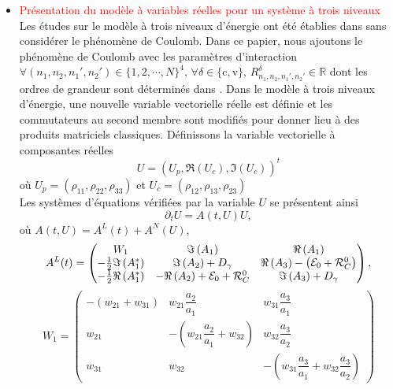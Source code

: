\documentclass[a4paper]{article}
\newcommand{\dt}{\partial_{t}}
\newcommand{\rc}{\mathrm{c}}
\newcommand{\rv}{\mathrm{v}}
\begin{document}
\begin{itemize}
\item \textcolor{red}{ Présentation du modèle à variables réelles pour un système à trois niveaux}
\\ Les études sur le modèle à trois niveaux d'énergie ont été établies dans \cite{Keita-Dicko24} sans considérer le phénomène de Coulomb. 
Dans ce papier, nous ajoutons le phénomène de Coulomb avec les paramètres d'interaction $\forall (n_1,n_2,n_1',n_2') \in \{1,2,\cdots,N\}^4$, $\forall \delta \in \{\rc,\rv\}$, $R_{n_1,n_2,n_1',n_2'}^{\delta} \in \mathbb{R}$ dont les ordres de grandeur sont déterminés dans \cite{Keita-Okou-Kamagate26}.  Dans le modèle à trois niveaux d'énergie, une nouvelle variable vectorielle réelle est définie et les commutateurs au second membre sont modifiés pour donner lieu à des produits matriciels classiques. Définissons la variable vectorielle à composantes réelles
\begin{equation*}
 U=\left( U_p, \Re(U_c),\Im(U_c)\right)^t
\end{equation*}
où $U_p=\left( \rho_{11},\rho_{22},\rho_{33}\right)$ et $U_c=\left( \rho_{12},\rho_{13},\rho_{23}\right)$
\\Les systèmes d'équations vérifiées par la variable $U$ se présentent ainsi 
\begin{equation}
\dt U =A(t,U)U,
\label{Eq_bloch3}
\end{equation}
où $A(t,U)=A^L (t)  + A^N(U)$,
\begin{equation*}
A^L(t)=
\begin{pmatrix}
W_{1} &   \Im\left(A_{1}\right)    & \Re\left(A_{1}\right)                        \\
    -\frac{1}{2}\Im\left(A^\mathrm{\small *}_{1}\right) & \Im\left(A_{2}\right)+D_{\gamma}                &  \Re\left(A_{3}\right) -\left(\mathcal{E}_{0}+\mathcal{R}^{0}_{C} \right) \\
-\frac{1}{2}\Re\left(A^\mathrm{\small *}_{1}\right)  & -\Re\left(A_{2}\right)+\mathcal{E}_{0}+ \mathcal{R}^{0}_{C}  &  \Im\left(A_{3}\right) + D_{\gamma}
\end{pmatrix},
\label{matrice Al}
\end{equation*} 
$$ W_{1}= 
\begin{pmatrix}
-(w_{21} + w_{31}) & w_{21}\dfrac{a_{2}}{a_{1}} & w_{31}\dfrac{a_{3}}{a_{1}}\\
            w_{21} & -(w_{21}\dfrac{a_{2}}{a_{1}} + w_{32}) & w_{32}\dfrac{a_{3}}{a_{2}}\\
            w_{31} &                                 w_{32} & -(w_{31}\dfrac{a_{3}}{a_{1}} + w_{32}\dfrac{a_{3}}{a_{2}})

\end{pmatrix}$$
\end{itemize}
\end{document}
